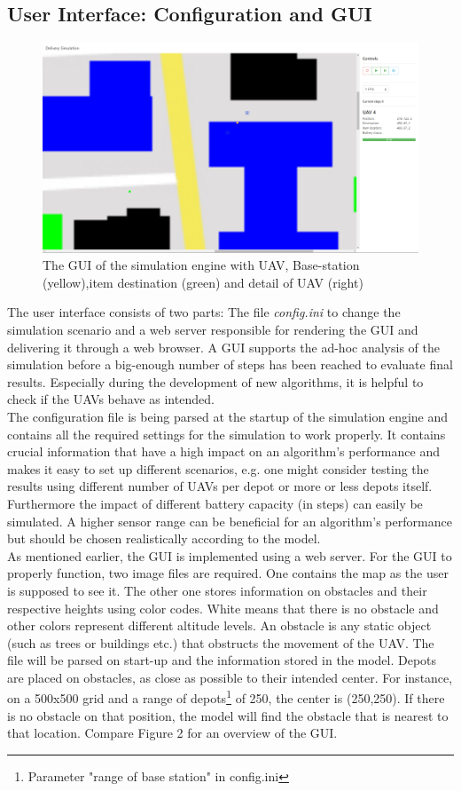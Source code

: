 \subsection{User Interface: Configuration and GUI}
\begin{figure}[htbp]\label{fig:gui}
	\centering
	\includegraphics[width=\textwidth]{images/gui}
	\caption{The GUI of the simulation engine with UAV, Base-station (yellow),item destination (green) and detail of UAV (right)}
\end{figure}
The user interface consists of two parts: The file \textit{config.ini} to change the simulation scenario and a web server responsible for rendering the GUI and delivering it through a web browser. A GUI supports the ad-hoc analysis of the simulation before a big-enough number of steps has been reached to evaluate final results. Especially during the development of new algorithms, it is helpful to check if the UAVs behave as intended.\\
The configuration file is being parsed at the startup of the simulation engine and contains all the required settings for the simulation to work properly. It contains crucial information that have a high impact on an algorithm's performance and makes it easy to set up different scenarios, e.g. one might consider testing the results using different number of UAVs per depot or more or less depots itself.
Furthermore the impact of different battery capacity (in steps) can easily be simulated. A higher sensor range can be beneficial for an algorithm's performance but should be chosen realistically according to the model.\\
As mentioned earlier, the GUI is implemented using a web server. For the GUI to properly function, two image files are required. One contains the map as the user is supposed to see it. The other one stores information on obstacles and their respective heights using color codes. White means that there is no obstacle and other colors represent different altitude levels. An obstacle is any static object (such as trees or buildings etc.) that obstructs the movement of the UAV. The file will be parsed on start-up and the information stored in the model.  Depots are placed on obstacles, as close as possible to their intended center. For instance, on a 500x500 grid and a range of depots\footnote{Parameter "range of base station" in config.ini} of 250, the center is (250,250). If there is no obstacle on that position, the model will find the obstacle that is nearest to that location. Compare Figure 2 for an overview of the GUI.\\
